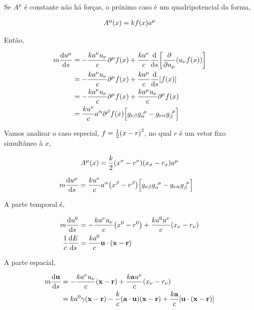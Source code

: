 \documentclass[twoside]{amsart}
\numberwithin{equation}{section}
\begin{document}
Se $A^\mu$ é constante não há forças, o próximo caso é um quadripotencial da forma,

\begin{align}
    A^\mu\qty(x)=kf\qty(x)a^\mu
\end{align}

Então,

\begin{align}
    m\dv{u^\mu}{s}&=-\frac{ka^\nu u_\nu}{c}\partial^\mu f\qty(x)+\frac {ka^\nu}{c}\dv{}{s}\qty[\pdv{}{u_\mu}\qty(u_\nu f\qty(x))]\\
    &=-\frac{ka^\nu u_\nu}{c} \partial^\mu f\qty(x)+\frac {ka^\mu}{c}\dv{}{s}\qty[f\qty(x)]\\
    &=-\frac{ka^\nu u_\nu}{c} \partial^\mu f\qty(x)+\frac {ka^\mu u_\nu}{c}\partial^\nu f\qty(x)\\
    &=\frac{ku^\nu}{c}a^\alpha \partial^\beta f\qty(x)\qty[g_{\nu\beta}g_\alpha^{\ \mu}-g_{\nu\alpha}g_\beta^{\ \mu}]
\end{align}

Vamos analisar o caso especial, $f=\frac12\qty(x-r)^2$, no qual $r$ é um vetor fixo simultâneo à $x$,

\begin{align}
    A^\mu\qty(x)=\frac k2\qty(x^\sigma-r^\sigma)\qty(x_\sigma-r_\sigma)a^\mu
\end{align}

\begin{align}
    m\dv{u^\mu}{s}&=\frac{ku^\nu}{c}a^\alpha \qty(x^\beta-r^\beta)\qty[g_{\nu\beta}g_\alpha^{\ \mu}-g_{\nu\alpha}g_\beta^{\ \mu}]
\end{align}

A parte temporal é,

\begin{align}
    m\dv{u^0}{s}&=-\frac {ka^\nu u_\nu}{c}\qty(x^0-r^0)+\frac{ka^0 u^\nu}{c}\qty(x_\nu-r_\nu)\\
    \frac1c\dv{E}{s}&=\frac{ka^0}{c}\vb u\cdot \qty(\vb x-\vb r)
\end{align}

A parte espacial,

\begin{align}
    m\dv{\vb u}{s}&=-\frac {ka^\nu u_\nu}{c}\qty(\vb x-\vb r)+\frac{k\vb a u^\nu}{c}\qty(x_\nu-r_\nu)\\
    &=ka^0\gamma\qty(\vb x-\vb r)-\frac kc \qty(\vb a\cdot \vb u)\qty(\vb x-\vb r)+\frac{k\vb a }{c}\qty[\vb u\cdot \qty(\vb x-\vb r)]\\
\end{align}
\end{document}
